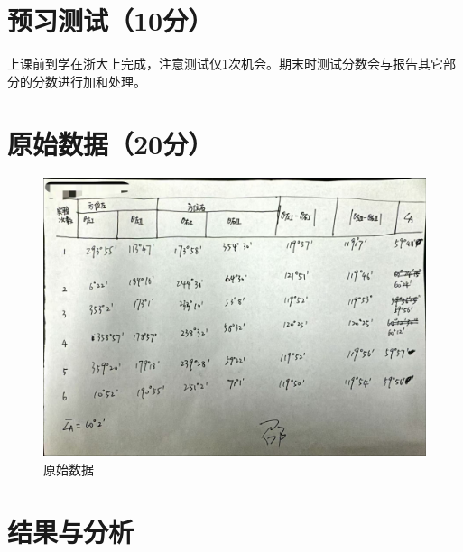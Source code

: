 \documentclass{../template/Report}%
\begin{document}
\maketitle%
\section{预习测试（10分）}
上课前到学在浙大上完成，注意测试仅1次机会。期末时测试分数会与报告其它部分的分数进行加和处理。
\section{原始数据（20分）}
\begin{figure}[H]
  \centering
  \includegraphics[width=.9\textwidth]{./figures/数据.jpg}
  \caption{原始数据}
\end{figure}
\section{结果与分析}
\end{document}
